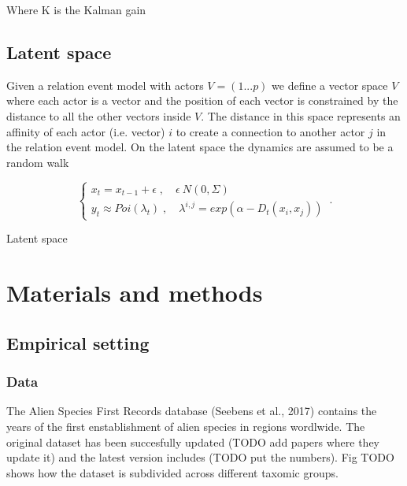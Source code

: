 \documentclass[mscthesis]{usiinfthesis}
\begin{document}
Where K is the Kalman gain


\section{Latent space}
Given a relation event model with actors $V=(1...p)$ we define a vector space $V$ where each actor is a vector and the position of each vector is constrained by the distance to all the other vectors inside $V$. The distance in this space represents an affinity of each actor (i.e. vector) $i$ to create a connection to another actor $j$ in the relation event model. On the latent space the dynamics are assumed to be a random walk


\begin{eqfloat}
\begin{equation}
    \begin{cases}
      x_t = x_{t-1} + \epsilon \; , \quad \epsilon ~ N(0, \Sigma) \\
      y_t \approx Poi(\lambda_t) \; , \quad \lambda^{i,j} = exp(\alpha - D_t(x_i, x_j))
    \end{cases}\,.
\label{eq:latent_randomwalk}
\end{equation}
\caption{Latent space}
\end{eqfloat}



\chapter{Materials and methods}

\section{Empirical setting}

\subsection{Data}

The Alien Species First Records database (Seebens et al., 2017) contains the years of the first enstablishment of alien species in regions wordlwide. The original dataset has been succesfully updated (TODO add papers where they update it) and the latest version includes (TODO put the numbers). Fig TODO shows how the dataset is subdivided across different taxomic groups. 
\end{document}
